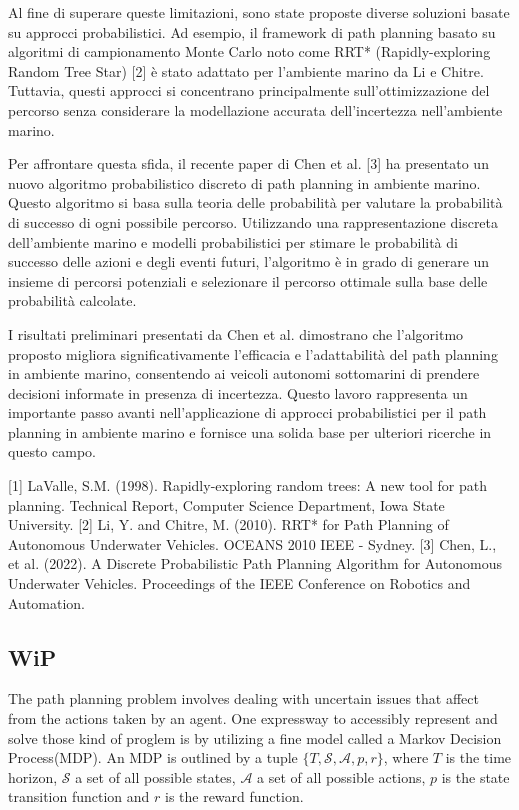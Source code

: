 \documentclass[journal,article,submit,pdftex,moreauthors]{Definitions/mdpi}
\begin{document}
Al fine di superare queste limitazioni, sono state proposte diverse soluzioni basate su approcci probabilistici. Ad esempio, il framework di path planning basato su algoritmi di campionamento Monte Carlo noto come RRT* (Rapidly-exploring Random Tree Star) [2] è stato adattato per l'ambiente marino da Li e Chitre. Tuttavia, questi approcci si concentrano principalmente sull'ottimizzazione del percorso senza considerare la modellazione accurata dell'incertezza nell'ambiente marino.

Per affrontare questa sfida, il recente paper di Chen et al. [3] ha presentato un nuovo algoritmo probabilistico discreto di path planning in ambiente marino. Questo algoritmo si basa sulla teoria delle probabilità per valutare la probabilità di successo di ogni possibile percorso. Utilizzando una rappresentazione discreta dell'ambiente marino e modelli probabilistici per stimare le probabilità di successo delle azioni e degli eventi futuri, l'algoritmo è in grado di generare un insieme di percorsi potenziali e selezionare il percorso ottimale sulla base delle probabilità calcolate.

I risultati preliminari presentati da Chen et al. dimostrano che l'algoritmo proposto migliora significativamente l'efficacia e l'adattabilità del path planning in ambiente marino, consentendo ai veicoli autonomi sottomarini di prendere decisioni informate in presenza di incertezza. Questo lavoro rappresenta un importante passo avanti nell'applicazione di approcci probabilistici per il path planning in ambiente marino e fornisce una solida base per ulteriori ricerche in questo campo.

[1] LaValle, S.M. (1998). Rapidly-exploring random trees: A new tool for path planning. Technical Report, Computer Science Department, Iowa State University.
[2] Li, Y. and Chitre, M. (2010). RRT* for Path Planning of Autonomous Underwater Vehicles. OCEANS 2010 IEEE - Sydney.
[3] Chen, L., et al. (2022). A Discrete Probabilistic Path Planning Algorithm for Autonomous Underwater Vehicles. Proceedings of the IEEE Conference on Robotics and Automation.

\subsection{WiP}

The path planning problem involves dealing with uncertain issues that affect from the actions taken by an agent. One expressway to accessibly represent and solve those kind of proglem is by utilizing 
a fine model called a Markov Decision Process(MDP). 
An MDP is outlined by a tuple  $\{T, \mathcal{S}, \mathcal{A}, p, r\}$, where $T$ is the time horizon, $\mathcal{S}$ a set of all possible states,
 $\mathcal{A}$ a set of all possible actions, $p$ is the state transition function and $r$ is the reward function.
\end{document}
